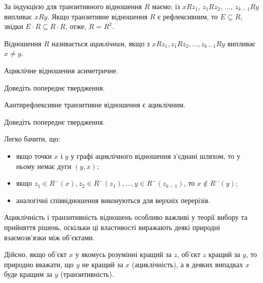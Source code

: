 За індукцією для транзитивного відношення $R$ маємо: із $x R z_1$, $z_1 R z_2$, $\ldots$, $z_{k-1} R y$ випливає $x R y$. Якщо транзитивне відношення $R$ є рефлексивним, то $E \subseteq R$, звідки $E \cdot R \subseteq R \cdot R$, отже, $R = R^2$.

\begin{definition}
	Відношення $R$ називається \textit{ациклічним}, якщо з $x R z_1, z_1 R z_2, \ldots, z_{k-1} R y$ випливає $x \ne y$.
\end{definition}

\begin{proposition}
	Ациклічне відношення асиметричне.
\end{proposition}

\begin{exercise}
	Доведіть попереднє твердження.
\end{exercise}

\begin{proposition}
	Аантирефлексивне транзитивне відношення є ациклічним. 
\end{proposition}

\begin{exercise}
	Доведіть попереднє твердження.
\end{exercise}

\begin{properties}
	Легко бачити, що:
	\begin{itemize}
		\item якщо точки $x$ і $y$ у графі ациклічного відношення з'єднані шляхом, то у ньому немає дуги $(y, x)$; 
		\item якщо $z_1 \in R^-(x), z_2 \in R^-(z_1), \ldots, y \in R^-(z_{k-1})$, то $x \notin R^-(y)$;
		\item аналогічні співвідношення виконуються для верхніх перерізів.
	\end{itemize}
\end{properties}

Ациклічність і транзитивність відношень особливо важливі у теорії вибору та прийняття рішень, оскільки ці властивості виражають деякі природні взаємозв'язки між об'єктами. \medskip

Дійсно, якщо об'єкт $x$ у якомусь розумінні кращий за $z$, об'єкт $z$ кращий за $y$, то природно вважати, що $y$ не кращий за $x$ (ациклічність), а в деяких випадках $x$ буде кращим за $y$ (транзитивність).

